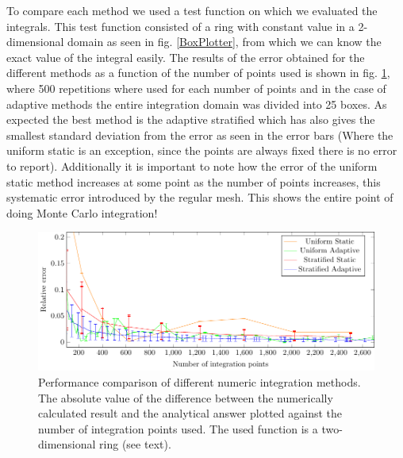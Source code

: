 To compare each method we used a test function on which we evaluated the integrals.
This test function consisted of a ring with constant value in a 2-dimensional domain as seen in fig. \ref{BoxPlotter}, from which
we can know the exact value of the integral easily. The results
of the error obtained for the different methods as a function of the number of points used is shown in fig. \ref{MCerrs},
 where 500 repetitions where used for each number of points and in the case of adaptive methods the entire integration
 domain was divided into 25 boxes. As
expected the best method is the adaptive stratified which has also gives the smallest standard deviation from the error as seen in the error bars (Where
the uniform static is an exception, since the points are always fixed there is no error to report).
Additionally it is important to note how the error of the uniform static
method increases at some point as the number of points increases, this systematic error introduced by the regular mesh. This shows the entire point of doing Monte Carlo integration!
\begin{figure}[ht]
  \begin{center}
  \includegraphics[scale=1 ]{graphs/integration_test_ring.pdf}
  \caption{Performance comparison of different numeric integration methods. The absolute value of the difference between the numerically calculated result and the analytical answer plotted against the number of integration points used. The used function is a two-dimensional ring (see text).}
  \label{MCerrs}
  \end{center}
\end{figure}
